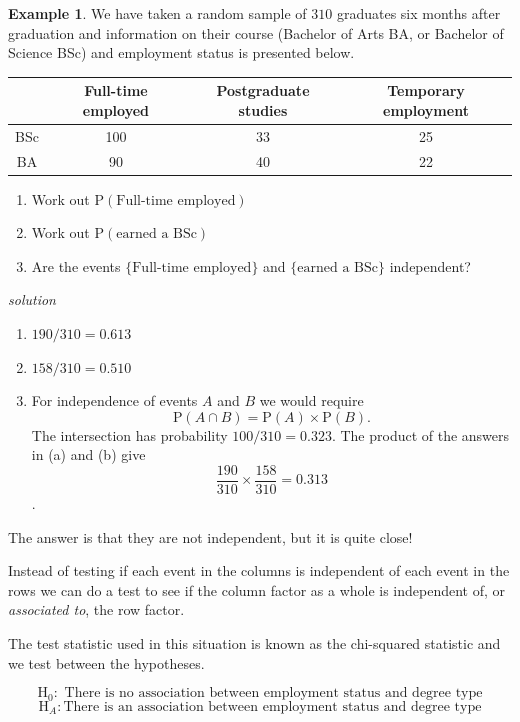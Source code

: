 \documentclass[
]{book}
\providecommand{\tightlist}{%
  \setlength{\itemsep}{0pt}\setlength{\parskip}{0pt}}
\theoremstyle{definition}
\theoremstyle{definition}
\newtheorem{example}{Example}[chapter]
\theoremstyle{definition}
\theoremstyle{definition}
\theoremstyle{remark}
\begin{document}
\begin{example}

We have taken a random sample of \(310\) graduates six months after graduation and information on their course (Bachelor of Arts BA, or Bachelor of Science BSc) and employment status is presented below.

\begin{longtable}[]{@{}cccc@{}}
\toprule
& Full-time employed & Postgraduate studies & Temporary employment\tabularnewline
\midrule
\endhead
BSc & 100 & 33 & 25\tabularnewline
BA & 90 & 40 & 22\tabularnewline
\bottomrule
\end{longtable}

\begin{enumerate}
\def\labelenumi{\alph{enumi})}
\item
  Work out \(\text{P}(\text{Full-time employed})\)
\item
  Work out \(\text{P}(\text{earned a BSc})\)
\item
  Are the events \(\{\text{Full-time employed}\}\) and \(\{\text{earned a BSc} \}\) independent?
\end{enumerate}

\end{example}

\emph{solution}

\begin{enumerate}
\def\labelenumi{\alph{enumi})}
\tightlist
\item
  \(190/310=0.613\)
\item
  \(158/310 = 0.510\)
\item
  For independence of events \(A\) and \(B\) we would require
  \[\text{P}(A\cap B)=\text{P}(A)\times\text{P}(B).\]
  The intersection has probability \(100/310 = 0.323\). The product of the answers in (a) and (b) give
  \[\frac{190}{310}\times\frac{158}{310}= 0.313\].
\end{enumerate}

The answer is that they are not independent, but it is quite close!

Instead of testing if each event in the columns is independent of each event in the rows we can do a test to see if the column factor as a whole is independent of, or \emph{associated to}, the row factor.

The test statistic used in this situation is known as the chi-squared statistic and we test between the hypotheses.

\[\text{H}_0: \text{ There is no association between employment status and degree type}\]
\[\text{H}_A: \text{There is an association between employment status and degree type}\]
\end{document}
